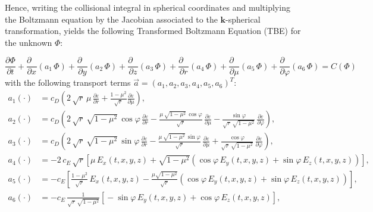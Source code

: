 \documentclass[11pt]{article}
\newcommand{\bk}{\mathbf{k}}
\newcommand{\eps}{\varepsilon}
\newcommand{\cd}[1]{c_{#1}}
\begin{document}
Hence, writing the collisional integral in spherical coordinates 
and multiplying the Boltzmann equation by the Jacobian associated to the $\bk$-spherical transformation, yields the following Transformed Boltzmann
Equation (TBE) for the unknown $\Phi$:

\begin{equation}
\frac{\partial \Phi}{\partial t} +
\frac{\partial \mbox{ }}{\partial x} \left( a_{1} \, \Phi \right) +
\frac{\partial \mbox{ }}{\partial y} \left( a_{2} \, \Phi \right) +
\frac{\partial \mbox{ }}{\partial z} \left( a_{3} \, \Phi \right) + 
\frac{\partial \mbox{ }}{\partial r} \left( a_{4} \, \Phi \right) + 
\frac{\partial \mbox{ }}{\partial \mu} \left( a_{5} \, \Phi \right) + 
\frac{\partial \mbox{ }}{\partial \varphi} \left(a_{6} \, \Phi \right) = C(\Phi)
\label{boltztrans}
\end{equation}
%
with the following transport terms
$\vec{a} = (a_1,a_2,a_3,a_4,a_5,a_6)^{T}$: 
%
\begin{align*}
%
a_{1}(\cdot) &  =  \cd{D} \left( 2 \, \sqrt{r} \, \mu \, \frac{\partial \eps}{\partial r}  + 
\frac{1 - \mu^{2}}{\sqrt{r}} \frac{\partial \eps}{\partial \mu} \right) ,
\\
%
a_{2}(\cdot) & =  \cd{D} \left(  2 \, \sqrt{r} \, \sqrt{1 - \mu^{2}} \,
\cos \varphi \, \frac{\partial \eps}{\partial r} - \frac{\mu \, \sqrt{1 - \mu^{2}} \, \cos
\varphi}{\sqrt{r}} \, \frac{\partial \eps}{\partial \mu} -
\frac{\sin \varphi}{\sqrt{r} \, \sqrt{1 - \mu^{2}}} \,
\frac{\partial \eps}{\partial \varphi} \right) ,
\\
%
a_{3}(\cdot) & =  \cd{D} \left( 2 \, \sqrt{r} \, \sqrt{1 - \mu^{2}} \,
\sin \varphi \, \frac{\partial \eps}{\partial r} - \frac{\mu \, \sqrt{1 - \mu^{2}} \, 
\sin \varphi}{\sqrt{r}} \, \frac{\partial \eps}{\partial \mu}  +
\frac{\cos \varphi}{\sqrt{r} \, \sqrt{1 - \mu^{2}}} \,
\frac{\partial \eps}{\partial \varphi} \right) ,
\\
%
a_{4}(\cdot) & =  - 2 \, \cd{E} \, \sqrt{r} \left[  \mu \,
E_{x}(t,x,y,z) + \sqrt{1 - \mu^{2}} \left( \cos \varphi \, E_{y}(t,x,y,z) +
\sin \varphi \, E_{z}(t,x,y,z) \right) \right] , %
\\
%
a_{5}(\cdot) & =  - \cd{E} \left[  \frac{1 - \mu^{2}}{\sqrt{r}} \,
E_{x}(t,x,y,z)- \frac{\mu \sqrt{1 - \mu^{2}}}{\sqrt{r}} \left( 
\cos \varphi \, E_{y}(t,x,y,z) + \sin \varphi \, E_{z}(t,x,y,z) \right) \right] ,
\\
%
a_{6}(\cdot) & =  - \cd{E} \, \frac{1}{\sqrt{r} \, \sqrt{1 - \mu^{2}}} 
\left[  \mbox{}- \sin \varphi \, E_{y}(t,x,y,z) + \cos \varphi \, E_{z}(t,x,y,z) \right]   ,
\end{align*}
\end{document}
